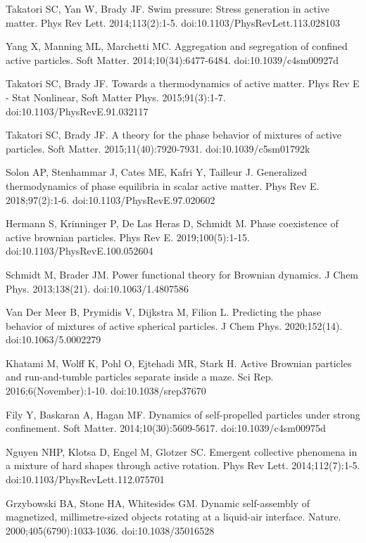 \documentclass[11pt]{article}
\begin{document}
\begin{thebibliography}{9}
Takatori SC, Yan W, Brady JF. Swim pressure: Stress generation in active matter. Phys Rev Lett. 2014;113(2):1-5. doi:10.1103/PhysRevLett.113.028103

Yang X, Manning ML, Marchetti MC. Aggregation and segregation of confined active particles. Soft Matter. 2014;10(34):6477-6484. doi:10.1039/c4sm00927d

Takatori SC, Brady JF. Towards a thermodynamics of active matter. Phys Rev E - Stat Nonlinear, Soft Matter Phys. 2015;91(3):1-7. doi:10.1103/PhysRevE.91.032117

Takatori SC, Brady JF. A theory for the phase behavior of mixtures of active particles. Soft Matter. 2015;11(40):7920-7931. doi:10.1039/c5sm01792k

Solon AP, Stenhammar J, Cates ME, Kafri Y, Tailleur J. Generalized thermodynamics of phase equilibria in scalar active matter. Phys Rev E. 2018;97(2):1-6. doi:10.1103/PhysRevE.97.020602

Hermann S, Krinninger P, De Las Heras D, Schmidt M. Phase coexistence of active brownian particles. Phys Rev E. 2019;100(5):1-15. doi:10.1103/PhysRevE.100.052604

Schmidt M, Brader JM. Power functional theory for Brownian dynamics. J Chem Phys. 2013;138(21). doi:10.1063/1.4807586

Van Der Meer B, Prymidis V, Dijkstra M, Filion L. Predicting the phase behavior of mixtures of active spherical particles. J Chem Phys. 2020;152(14). doi:10.1063/5.0002279

Khatami M, Wolff K, Pohl O, Ejtehadi MR, Stark H. Active Brownian particles and run-and-tumble particles separate inside a maze. Sci Rep. 2016;6(November):1-10. doi:10.1038/srep37670

Fily Y, Baskaran A, Hagan MF. Dynamics of self-propelled particles under strong confinement. Soft Matter. 2014;10(30):5609-5617. doi:10.1039/c4sm00975d

Nguyen NHP, Klotsa D, Engel M, Glotzer SC. Emergent collective phenomena in a mixture of hard shapes through active rotation. Phys Rev Lett. 2014;112(7):1-5. doi:10.1103/PhysRevLett.112.075701

Grzybowski BA, Stone HA, Whitesides GM. Dynamic self-assembly of magnetized, millimetre-sized objects rotating at a liquid-air interface. Nature. 2000;405(6790):1033-1036. doi:10.1038/35016528


\end{thebibliography}
\end{document}
